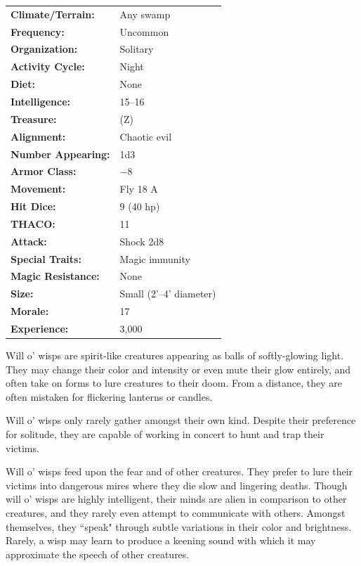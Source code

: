 \begin{multicols}{2}
\begin{minipage}{\columnwidth}
\noindent \begin{tabular}{p{}p{}}
\textbf{Climate/Terrain:}	& Any swamp	\\
\textbf{Frequency:} 		& Uncommon	\\
\textbf{Organization:} 		& Solitary	\\
\textbf{Activity Cycle:} 	& Night	\\
\textbf{Diet:} 				& None	\\
\textbf{Intelligence:} 		& 15--16	\\
\textbf{Treasure:} 			& (Z)	\\
\textbf{Alignment:} 		& Chaotic evil	\\
\hline
\textbf{Number Appearing:} 	& 1d3	\\
\textbf{Armor Class:} 		& $-8$	\\
\textbf{Movement:} 			& Fly 18 A	\\
\textbf{Hit Dice:} 			& 9 (40 hp)	\\
\textbf{THACO:} 			& 11	\\
\textbf{Attack:} 			& Shock 2d8	\\
\textbf{Special Traits:} & Magic immunity	\\
\textbf{Magic Resistance:} 	& None	\\
\textbf{Size:} 				& Small (2'--4' diameter)	\\
\textbf{Morale:} 			& 17	\\
\textbf{Experience:} 		& 3,000	\\
\end{tabular}

\end{minipage}

Will o' wisps are spirit-like creatures appearing as balls of softly-glowing light. They may change their color and intensity or even mute their glow entirely, and often take on forms to lure creatures to their doom. From a distance, they are often mistaken for flickering lanterns or candles.

Will o' wisps only rarely gather amongst their own kind. Despite their preference for solitude, they are capable of working in concert to hunt and trap their victims.

Will o' wisps feed upon the fear and of other creatures. They prefer to lure their victims into dangerous mires where they die slow and lingering deaths. Though will o' wisps are highly intelligent, their minds are alien in comparison to other creatures, and they rarely even attempt to communicate with others. Amongst themselves, they ``speak" through subtle variations in their color and brightness. Rarely, a wisp may learn to produce a keening sound with which it may approximate the speech of other creatures.


\end{multicols}
